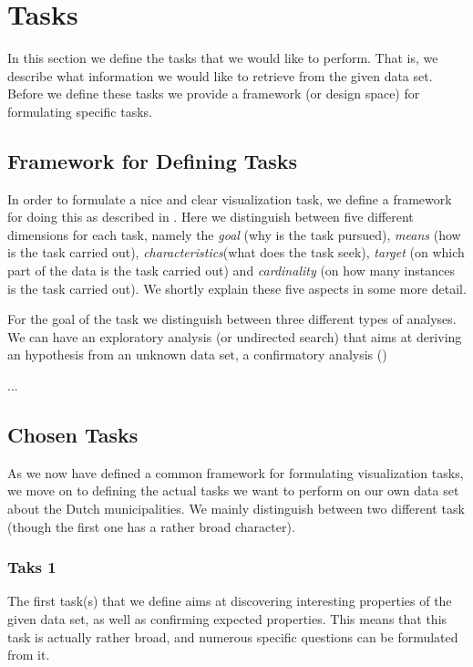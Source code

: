 \section{Tasks}

In this section we define the tasks that we would like to perform. That is, we describe what information we would like to retrieve from the given data set. Before we define these tasks we provide a framework (or design space) for formulating specific tasks.

\subsection{Framework for Defining Tasks}
In order to formulate a nice and clear visualization task, we define a framework for doing this as described in \cite{schulz2013design}. Here we distinguish between five different dimensions for each task, namely the \textit{goal} (why is the task pursued), \textit{means} (how is the task carried out), \textit{characteristics}(what does the task seek), \textit{target} (on which part of the data is the task carried out) and \textit{cardinality} (on how many instances is the task carried out). We shortly explain these five aspects in some more detail.

For the goal of the task we distinguish between three different types of analyses. We can have an exploratory analysis (or undirected search) that aims at deriving an hypothesis from an unknown data set, a confirmatory analysis ()

\todo{!}...

\subsection{Chosen Tasks}
As we now have defined a common framework for formulating visualization tasks, we move on to defining the actual tasks we want to perform on our own data set about the Dutch municipalities. We mainly distinguish between two different task (though the first one has a rather broad character).

\subsubsection{Taks 1}
The first task(s) that we define aims at discovering interesting properties of the given data set, as well as confirming expected properties. This means that this task is actually rather broad, and numerous specific questions can be formulated from it. 

